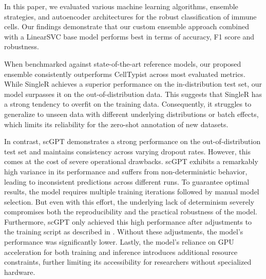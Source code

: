 \documentclass[11pt]{article}
\begin{document}

In this paper, we evaluated various machine learning algorithms, ensemble strategies, and autoencoder architectures for the robust classification of immune cells. Our findings demonstrate that our custom ensemble approach combined with a LinearSVC base model performs best in terms of accuracy, F1 score and robustness. %


When benchmarked against state-of-the-art reference models, our proposed ensemble consistently outperforms CellTypist across most evaluated metrics. While SingleR achieves a superior performance on the in-distribution test set, our model surpasses it on the out-of-distribution data. This suggests that SingleR has a strong tendency to overfit on the training data. Consequently, it struggles to generalize to unseen data with different underlying distributions or batch effects, which limits its reliability for the zero-shot annotation of new datasets.

In contrast, scGPT demonstrates a strong performance on the out-of-distribution test set and maintains consistency across varying dropout rates. However, this comes at the cost of severe operational drawbacks. scGPT exhibits a remarkably high variance in its performance and suffers from non-deterministic behavior, leading to inconsistent predictions across different runs. To guarantee optimal results, the model requires multiple training iterations followed by manual model selection. But even with this effort, the underlying lack of determinism severely compromises both the reproducibility and the practical robustness of the model. 
Furthermore, scGPT only achieved this high performance after adjustments to the training script as described in . Without these adjustments, the model's performance was significantly lower. 
Lastly, the model's reliance on GPU acceleration for both training and inference introduces additional resource constraints, further limiting its accessibility for researchers without specialized hardware.
\end{document}
